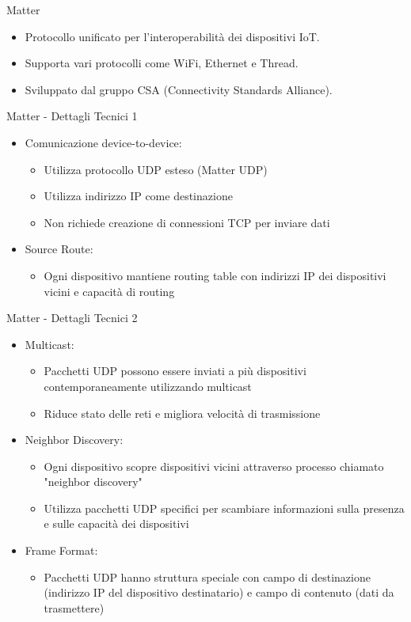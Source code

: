 \documentclass{beamer}
\begin{document}
	\begin{frame}{Matter}
		\begin{itemize}
			\item Protocollo unificato per l'interoperabilità dei dispositivi IoT.
			\item Supporta vari protocolli come WiFi, Ethernet e Thread.
			\item Sviluppato dal gruppo CSA (Connectivity Standards Alliance).
		\end{itemize}
	\end{frame}
\begin{frame}{Matter - Dettagli Tecnici 1}
	\begin{itemize}
		\item Comunicazione device-to-device:
		\begin{itemize}
			\item Utilizza protocollo UDP esteso (Matter UDP)
			\item Utilizza indirizzo IP come destinazione
			\item Non richiede creazione di connessioni TCP per inviare dati
		\end{itemize}
		\item Source Route:
		\begin{itemize}
			\item Ogni dispositivo mantiene routing table con indirizzi IP dei dispositivi vicini e capacità di routing
		\end{itemize}
	\end{itemize}
\end{frame}
\begin{frame}{Matter - Dettagli Tecnici 2}
	\begin{itemize}
		\item Multicast:
		\begin{itemize}
			\item Pacchetti UDP possono essere inviati a più dispositivi contemporaneamente utilizzando multicast
			\item Riduce stato delle reti e migliora velocità di trasmissione
		\end{itemize}
		\item Neighbor Discovery:
		\begin{itemize}
			\item Ogni dispositivo scopre dispositivi vicini attraverso processo chiamato "neighbor discovery"
			\item Utilizza pacchetti UDP specifici per scambiare informazioni sulla presenza e sulle capacità dei dispositivi
		\end{itemize}
		\item Frame Format:
		\begin{itemize}
			\item Pacchetti UDP hanno struttura speciale con campo di destinazione (indirizzo IP del dispositivo destinatario) e campo di contenuto (dati da trasmettere)
		\end{itemize}
	\end{itemize}
\end{frame}
\end{document}
